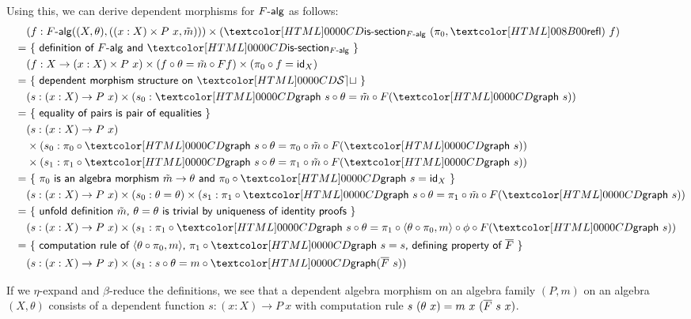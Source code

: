 Using this, we can derive dependent morphisms for $\algcat{F}$ as
follows:
\begin{align*}
  &&&(f : \algcat{F}((X,\theta),((x : X) \times P\ x , \tilde{m}))) \times (\issection_{\algcat{F}}\ (\pi_0, \refl)\ f) \\
  &&=&\ \reasontext{definition of $\algcat{F}$ and $\issection_{\algcat{F}}$} \\
  &&&(f : X \to (x : X) \times P\ x) \times (f \circ \theta = \tilde{m} \circ Ff) \times (\pi_0 \circ f = \id_X) \\
  &&=&\ \reasontext{dependent morphism structure on $\SET$} \\
  &&&(s : (x : X) \to P\ x) \times (s_0 : \grph\ s \circ \theta = \tilde{m} \circ F (\grph\ s)) \\
  &&=&\ \reasontext{equality of pairs is pair of equalities} \\
  &&&(s : (x : X) \to P\ x) \\
  &&&\times (s_0 : \pi_0 \circ \grph\ s \circ \theta = \pi_0 \circ \tilde{m} \circ F (\grph\ s)) \\
  &&&\times (s_1 : \pi_1 \circ \grph\ s \circ \theta = \pi_1 \circ \tilde{m} \circ F (\grph\ s)) \\
  &&=&\ \reasontext{$\pi_0$ is an algebra morphism $\tilde{m} \to \theta$ and $\pi_0 \circ \grph\ s = \id_X$} \\
  &&&(s : (x : X) \to P\ x) \times (s_0 : \theta = \theta) \times (s_1 : \pi_1 \circ \grph\ s \circ \theta = \pi_1 \circ \tilde{m} \circ F (\grph\ s))  \\
  &&=&\ \reasontext{unfold definition $\tilde{m}$, $\theta = \theta$ is trivial by uniqueness of identity proofs} \\
  &&&(s : (x : X) \to P\ x) \times (s_1 : \pi_1 \circ \grph\ s \circ \theta = \pi_1 \circ \langle \theta \circ \pi_0 , m \rangle \circ \phi \circ F (\grph\ s)) \\
  &&=&\ \reasontext{computation rule of $\langle \theta \circ \pi_0 , m \rangle$, $\pi_1 \circ \grph\ s = s$, defining property of $\liftdephom{F}$} \\
  &&&(s : (x : X) \to P\ x) \times (s_1 : s \circ \theta = m \circ \grph (\liftdephom{F}\ s))
\end{align*}

If we $\eta$-expand and $\beta$-reduce the definitions, we see that a
dependent algebra morphism on an algebra family $(P,m)$ on an algebra
$(X,\theta)$ consists of a dependent function $s : (x : X) \to P\ x$
with computation rule $s\ (\theta\ x) = m\ x\ (\liftdephom{F}\ s\ x)$.

